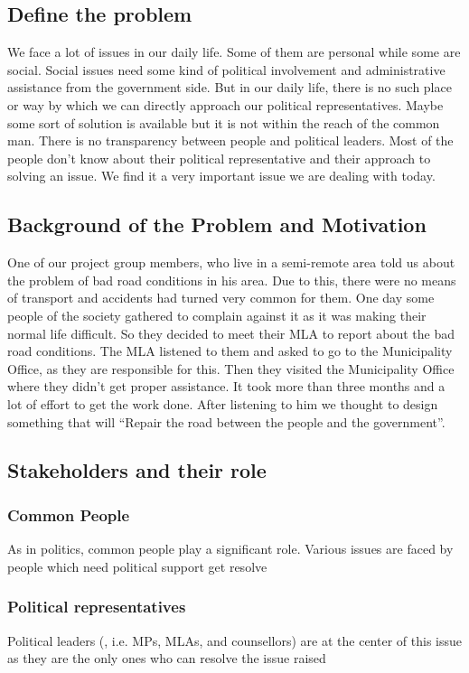 \documentclass[acmtog]{acmart}
\begin{document}
\subsection{Define the problem}
We face a lot of issues in our daily life. Some of them are personal while some are social. Social issues need some kind of political involvement and administrative assistance from the government side. But in our daily life, there is no such place or way by which we can directly approach our political representatives. Maybe some sort of solution is available but it is not within the reach of the common man. There is no transparency between people and political leaders. Most of the people don’t know about their political representative and their approach to solving an issue. We find it a very important issue we are dealing with today.

\subsection{Background of the Problem and Motivation}
One of our project group members, who live in a semi-remote area told us about the problem of bad road conditions in his area. Due to this, there were no means of transport and accidents had turned very common for them. One day some people of the society gathered to complain against it as it was making their normal life difficult. So they decided to meet their MLA to report about the bad road conditions. The MLA listened to them and asked to go to the Municipality Office, as they are responsible for this. Then they visited the Municipality Office where they didn’t get proper assistance. It took more than three months and a lot of effort to get the work done. After listening to him we thought to design something that will “Repair the road between the people and the government”.

\subsection{Stakeholders and their role}
\subsubsection{Common People}
As in politics, common people play a significant role. Various issues are faced by people which need political support get resolve
\subsubsection{Political representatives}
Political leaders (, i.e. MPs, MLAs, and counsellors) are at the center of this issue as they are the only ones who can resolve the issue raised
\end{document}
